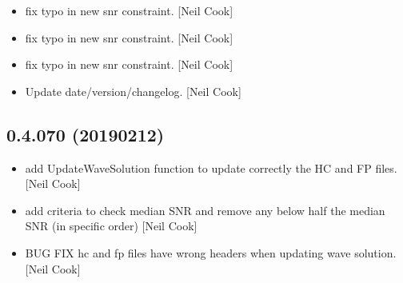 \documentclass[a4paper,10pt,english]{report}
\begin{document}
\begin{itemize}
\item {} 
 \sphinxhyphen{} fix typo in new snr constraint. {[}Neil Cook{]}

\item {} 
 \sphinxhyphen{} fix typo in new snr constraint. {[}Neil Cook{]}

\item {} 
 \sphinxhyphen{} fix typo in new snr constraint. {[}Neil Cook{]}

\item {} 
Update date/version/changelog. {[}Neil Cook{]}

\end{itemize}


\subsection{0.4.070 (2019\sphinxhyphen{}02\sphinxhyphen{}12)}
\label{\detokenize{misc/changelog:id206}}\begin{itemize}
\item {} 
 \sphinxhyphen{} add UpdateWaveSolution  function to
update correctly the HC and FP files. {[}Neil Cook{]}

\item {} 
 \sphinxhyphen{} add criteria to check median SNR and remove
any below half the median SNR (in specific order) {[}Neil Cook{]}

\item {} 
 \sphinxhyphen{} BUG FIX \sphinxhyphen{} hc and fp files have wrong
headers when updating wave solution. {[}Neil Cook{]}

\end{itemize}
\end{document}
